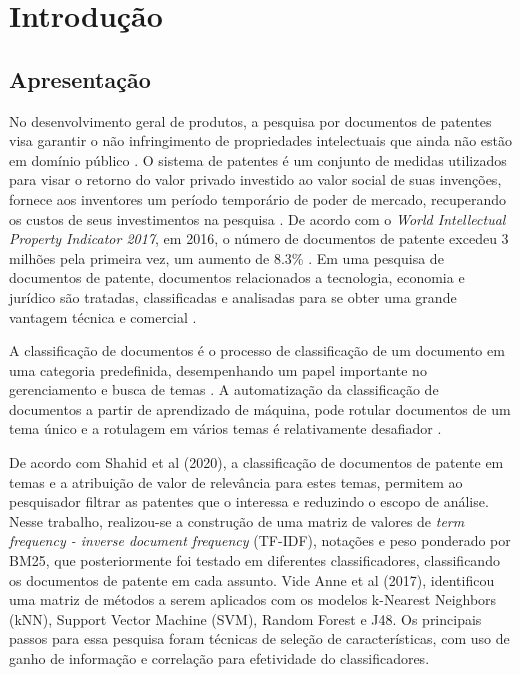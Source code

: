 
\chapter[Introdução]{Introdução}


\section{Apresentação}	

No desenvolvimento geral de produtos, a pesquisa por documentos de patentes visa garantir o não infringimento de propriedades intelectuais que ainda não estão em domínio público \cite{Breitzman2002}.  O sistema de patentes é um conjunto de medidas utilizados para visar o retorno do valor privado investido ao valor social de suas invenções, fornece aos inventores um período temporário de poder de mercado, recuperando os custos de seus investimentos na pesquisa \cite{Williams2017}. De acordo com o \textit{World Intellectual Property Indicator 2017}, em 2016, o número de documentos de patente excedeu 3 milhões pela primeira vez, um aumento de 8.3\% \cite{Li2018}. Em uma pesquisa de documentos de patente, documentos relacionados a tecnologia, economia e jurídico são tratadas, classificadas e analisadas para se obter uma grande vantagem técnica e comercial \cite{Li2018}.

A classificação de documentos é o processo de classificação de um documento em uma categoria predefinida, desempenhando um papel importante no gerenciamento e busca de temas \cite{Anne2017}. A automatização da classificação de documentos a partir de aprendizado de máquina, pode rotular documentos de um tema único e a rotulagem em vários temas é relativamente desafiador \cite{Anne2017}.

De acordo com Shahid et al (2020), a classificação de documentos de patente em temas e a atribuição de valor de relevância para estes temas, permitem ao pesquisador filtrar as patentes que o interessa e reduzindo o escopo de análise. Nesse trabalho, realizou-se a construção de uma matriz de valores de \textit{term frequency - inverse document frequency} (TF-IDF), notações e peso ponderado por BM25, que posteriormente foi testado em diferentes classificadores, classificando os documentos de patente em cada assunto.
Vide Anne et al (2017), identificou uma matriz de métodos a serem aplicados com os modelos k-Nearest Neighbors (kNN),  Support Vector Machine (SVM), Random Forest e J48. Os principais passos para essa pesquisa foram técnicas de seleção de características, com uso de ganho de informação e correlação para efetividade do classificadores.


